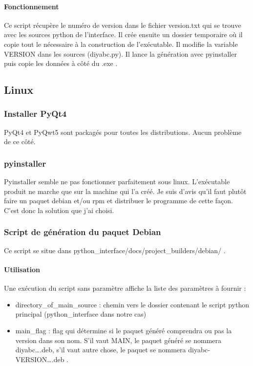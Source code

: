 \documentclass[12pt,a4paper]{article}
\begin{document}
        \paragraph{Fonctionnement}

        Ce script récupère le numéro de version dans le fichier version.txt qui se trouve avec les sources python de l'interface. Il crée ensuite un
        dossier temporaire où il copie tout le nécessaire à la construction de l'exécutable. Il modifie la variable VERSION dans les sources (diyabc.py).
        Il lance la génération avec pyinstaller puis copie les données à côté du .exe .

    \subsection{Linux}
        \subsubsection{Installer PyQt4}

        PyQt4 et PyQwt5 sont packagés pour toutes les distributions. Aucun problème de ce côté.
        \subsubsection{pyinstaller}

        Pyinstaller semble ne pas fonctionner parfaitement sous linux. L'exécutable produit ne marche que
        sur la machine qui l'a créé. Je suis d'avis qu'il faut plutôt faire un paquet debian et/ou rpm
        et distribuer le programme de cette façon. C'est donc la solution que j'ai choisi.
        \subsubsection{Script de génération du paquet Debian}

        Ce script se situe dans python\_interface/docs/project\_builders/debian/ .
        \paragraph{Utilisation}

        Une exécution du script sans paramètre affiche la liste des paramètres à fournir :\\

        \begin{itemize}
            \item directory\_of\_main\_source : chemin vers le dossier contenant le script python principal (python\_interface dans notre cas)
            \item main\_flag : flag qui détermine si le paquet généré comprendra ou pas la version dans son nom. S'il vaut MAIN, le paquet généré
                se nommera diyabc\ldots.deb, s'il vaut autre chose, le paquet se nommera diyabc-VERSION\ldots.deb .\\
        \end{itemize}
\end{document}
